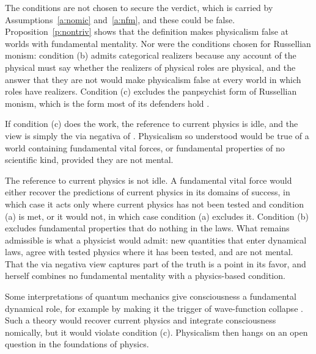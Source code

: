 \documentclass{situationist-preprint}
\begin{document}
\begin{reply}
The conditions are not chosen to secure the verdict, which is carried by Assumptions~\ref{a:nomic} and~\ref{a:nfm}, and these could be false. Proposition~\ref{p:nontriv} shows that the definition makes physicalism false at worlds with fundamental mentality. Nor were the conditions chosen for Russellian monism: condition (b) admits categorical realizers because any account of the physical must say whether the realizers of physical roles are physical, and the answer that they are not would make physicalism false at every world in which roles have realizers. Condition (c) excludes the panpsychist form of Russellian monism, which is the form most of its defenders hold \citep{Goff2017}.
\end{reply}

\begin{objection}
If condition (c) does the work, the reference to current physics is idle, and the view is simply the via negativa of \citet{Montero1999}. Physicalism so understood would be true of a world containing fundamental vital forces, or fundamental properties of no scientific kind, provided they are not mental.
\end{objection}

\begin{reply}
The reference to current physics is not idle. A fundamental vital force would either recover the predictions of current physics in its domains of success, in which case it acts only where current physics has not been tested and condition (a) is met, or it would not, in which case condition (a) excludes it. Condition (b) excludes fundamental properties that do nothing in the laws. What remains admissible is what a physicist would admit: new quantities that enter dynamical laws, agree with tested physics where it has been tested, and are not mental. That the via negativa view captures part of the truth is a point in its favor, and \citet{Wilson2006} herself combines no fundamental mentality with a physics-based condition.
\end{reply}

\begin{objection}
Some interpretations of quantum mechanics give consciousness a fundamental dynamical role, for example by making it the trigger of wave-function collapse \citep{ChalmersMcQueen2022}. Such a theory would recover current physics and integrate consciousness nomically, but it would violate condition (c). Physicalism then hangs on an open question in the foundations of physics.
\end{objection}
\end{document}
